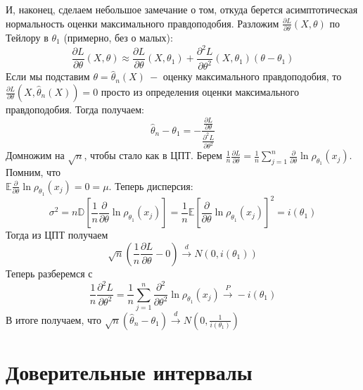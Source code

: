 \begin{remark}
И, наконец, сделаем небольшое замечание о том, откуда берется асимптотическая нормальность оценки максимального правдоподобия. Разложим $\frac{\partial L}{\partial \theta}\left(X, \theta\right)$ по Тейлору в $\theta_1$ (примерно, без о малых):
\[
    \frac{\partial L}{\partial \theta}\left(X, \theta\right) \approx \frac{\partial L}{\partial \theta}\left(X, \theta_1\right) + \frac{\partial ^ 2 L}{\partial \theta ^ 2}\left(X, \theta_1\right)\left(\theta - \theta_1\right)
\]
Если мы подставим $\theta = \widehat{\theta}_n\left(X\right) \ - $ оценку максимального правдоподобия, то $\frac{\partial L}{\partial \theta}\left(X, \widehat{\theta}_n\left(X\right)\right) = 0$ просто из определения оценки максимального правдоподобия. Тогда получаем:
\[
    \widehat{\theta}_n - \theta_1 = -\frac{\frac{\partial L}{\partial \theta}}{\frac{\partial ^ 2 L}{\partial \theta ^ 2}}
\]
Домножим на $\sqrt{n}$, чтобы стало как в ЦПТ. Берем $\frac 1 n \frac{\partial L}{\partial \theta} = \frac 1 n \sum_{j = 1}^{n} \frac{\partial}{\partial \theta} \ln \rho_{\theta_1}\left(x_j\right)$. Помним, что \\ $\mathbb{E} \frac{\partial}{\partial \theta} \ln \rho_{\theta_1}\left(x_j\right) = 0 = \mu$. Теперь дисперсия: 
\[\sigma ^ 2 = n\mathbb{D} \left[\frac 1 n \frac{\partial}{\partial \theta} \ln \rho_{\theta_1}\left(x_j\right)\right] = \frac 1 n \mathbb{E} \left[\frac{\partial}{\partial \theta} \ln \rho_{\theta_1}\left(x_j\right)\right] ^ 2 = i\left(\theta_1\right)
\]
Тогда из ЦПТ получаем
\[
    \sqrt{n} \left(\frac 1 n\frac{\partial L}{\partial \theta} - 0\right) \xrightarrow{d} N\left(0, i\left(\theta_1\right)\right)
\]
Теперь разберемся с 
\[
    \frac 1 n \frac{\partial ^ 2 L}{\partial \theta ^ 2} = \frac 1 n \sum_{j = 1}^{n} \frac{\partial ^ 2}{\partial \theta ^ 2} \ln \rho_{\theta_1}\left(x_j\right) \xrightarrow{P} -i\left(\theta_1\right)
\]
В итоге получаем, что $\sqrt{n}\left(\widehat{\theta}_n - \theta_1\right) \xrightarrow{d} N\left(0, \frac 1 {i\left(\theta_1\right)}\right)$
\end{remark}

\clearpage

\section{Доверительные интервалы}


